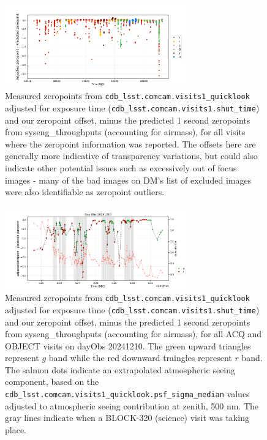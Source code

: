 \begin{figure}
    \centering
    \includegraphics[width=0.7\textwidth]{sp/all_zeropoints.png}
    \caption{Measured zeropoints from \texttt{cdb\_lsst.comcam.visits1\_quicklook} adjusted for exposure time (\texttt{cdb\_lsst.comcam.visits1.shut\_time}) and our zeropoint offset, minus the predicted 1 second zeropoints from syseng\_throughputs (accounting for airmass), for all visits where the zeropoint information was reported. The offsets here are generally more indicative of transparency variations, but could also indicate other potential issues such as excessively out of focus images - many of the bad images on DM's list of excluded images were also identifiable as zeropoint outliers.}
    \label{fig:all_zeropoints}
    \end{figure}


\begin{figure}
    \centering
    \includegraphics[width=0.7\textwidth]{sp/zeropoints_dayobs_20241210.png}
    \caption{Measured zeropoints from \texttt{cdb\_lsst.comcam.visits1\_quicklook} adjusted for exposure time (\texttt{cdb\_lsst.comcam.visits1.shut\_time}) and our zeropoint offset, minus the predicted 1 second zeropoints from syseng\_throughputs (accounting for airmass), for all ACQ and OBJECT visits on dayObs 20241210. The green upward triangles represent $g$ band while the red downward traingles represent $r$ band. The salmon dots indicate an extrapolated atmospheric seeing component, based on the \texttt{cdb\_lsst.comcam.visits1\_quicklook.psf\_sigma\_median} values adjusted to atmospheric seeing contribution at zenith, 500 nm. The gray lines indicate when a BLOCK-320 (science) visit was taking place. }
    \label{fig:zeropoints_dayobs_20241210}
    \end{figure}


